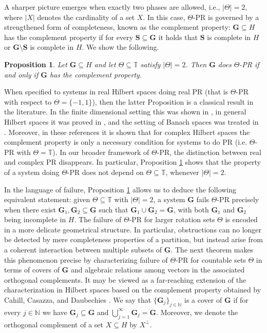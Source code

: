 \documentclass[reqno,a4paper,11pt]{amsart}
\numberwithin{equation}{section}
\newtheorem{proposition}[definition]{Proposition}
\def\N{{\mathbb N}}
\def\T{{\mathbb T}}
\newcommand\1{\mathds{1}}
\begin{document}
A sharper picture emerges when exactly two phases are allowed, i.e., $|\Theta|=2$, where $|X|$ denotes the cardinality of a set $X$. In this case, $\Theta$-PR is governed by a strengthened form of completeness, known as the complement property: $\mathbf{G} \subseteq H$ has the complement property if for every $\mathbf{S} \subseteq \mathbf{G}$ it holds that $\mathbf{S}$ is complete in $H$ or $\mathbf{G} \setminus \mathbf{S}$ is complete in $H$. We show the following.

\begin{proposition}\label{prop:cp}
Let $\mathbf{G} \subseteq H$ and let $\Theta \subseteq \T$ satisfy $|\Theta|=2$. Then $\mathbf{G}$ does $\Theta$-PR if and only if $\mathbf{G}$ has the complement property.
\end{proposition}

When specified to systems in real Hilbert spaces doing real PR (that is $\Theta$-PR with respect to $\Theta=\{-1,1\}$), then the latter Proposition is a classical result in the literature. In the finite dimensional setting this was shown in \cite{balan2006signal}, in general Hilbert spaces it was proved in \cite{cahill2016phase}, and the setting of Banach spaces was treated in \cite{alaifari2017phase}. Moreover, in these references it is shown that for complex Hilbert spaces the complement property is only a necessary condition for systems to do PR (i.e. $\Theta$-PR with $\Theta=\T$). In our broader framework of $\Theta$-PR, the distinction between real and complex PR disappears. In particular, Proposition \ref{prop:cp} shows that the property of a system doing $\Theta$-PR does not depend on $\Theta\subseteq\T$, whenever $|\Theta|=2$.

In the language of failure, Proposition \ref{prop:cp} allows us to deduce the following equivalent statement: given $\Theta\subseteq \T$ with $|\Theta|=2$, a system $\mathbf{G}$ fails $\Theta$-PR precisely when there exist $\mathbf{G}_1, \mathbf{G}_2 \subseteq \mathbf{G}$ such that $\mathbf{G}_1\cup \mathbf{G}_2=\mathbf{G}$, with both $\mathbf{G}_1$ and $\mathbf{G}_2$ being incomplete in $H$. The failure of $\Theta$-PR for larger rotation sets $\Theta$ is encoded in a more delicate geometrical structure. In particular, obstructions can no longer be detected by mere completeness properties of a partition, but instead arise from a coherent interaction between multiple subsets of $\mathbf{G}$. The next theorem makes this phenomenon precise by characterizing failure of $\Theta$-PR for countable sets $\Theta$ in terms of covers of $\mathbf{G}$ and algebraic relations among vectors in the associated orthogonal complements. It may be viewed as a far-reaching extension of the characterization in Hilbert spaces based on the complement property obtained by Cahill, Casazza, and Daubechies \cite[Theorem 1.2]{cahill2016phase}. We say that $\{\mathbf{G}_j\}_{j \in \N}$ is a cover of $\mathbf{G}$ if for every $j\in\N$ we have $\mathbf{G}_j\subseteq \mathbf{G}$ and $\bigcup_{j=1}^\infty \mathbf{G}_j = \mathbf{G}$. Moreover, we denote the orthogonal complement of a set $X \subseteq H$ by $X^\perp$.
\end{document}

